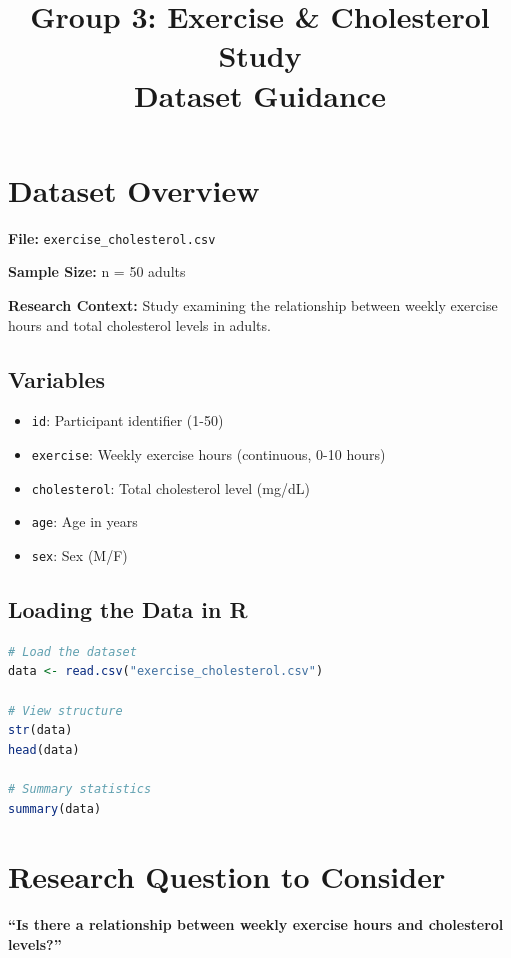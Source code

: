 \documentclass[11pt]{article}
\title{\textbf{Group 3: Exercise \& Cholesterol Study}\\
\large{Dataset Guidance}}
\author{}
\date{}
\begin{document}
\maketitle

\section*{Dataset Overview}

\textbf{File:} \texttt{exercise\_cholesterol.csv}

\textbf{Sample Size:} n = 50 adults

\textbf{Research Context:} Study examining the relationship between weekly exercise hours and total cholesterol levels in adults.

\subsection*{Variables}

\begin{itemize}
\item \texttt{id}: Participant identifier (1-50)
\item \texttt{exercise}: Weekly exercise hours (continuous, 0-10 hours)
\item \texttt{cholesterol}: Total cholesterol level (mg/dL)
\item \texttt{age}: Age in years
\item \texttt{sex}: Sex (M/F)
\end{itemize}

\subsection*{Loading the Data in R}

\begin{lstlisting}[language=R, basicstyle=\small\ttfamily, breaklines=true]
# Load the dataset
data <- read.csv("exercise_cholesterol.csv")

# View structure
str(data)
head(data)

# Summary statistics
summary(data)
\end{lstlisting}

\section*{Research Question to Consider}

\textbf{``Is there a relationship between weekly exercise hours and cholesterol levels?''}
\end{document}
